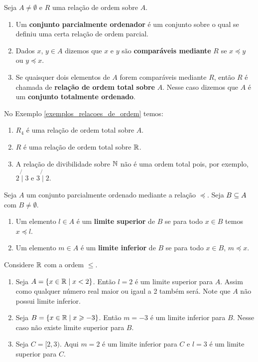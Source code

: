 \begin{definicoes}
	Seja $A \ne \emptyset$ e $R$ uma relação de ordem sobre $A$.
	\begin{enumerate}[label={\roman*})]
		\item Um \textbf{conjunto parcialmente ordenador} é um conjunto sobre o qual se definiu uma certa relação de ordem parcial.
		\item Dados $x$, $y \in A$ dizemos que $x$ e $y$ são \textbf{comparáveis mediante} $R$ se $x \preceq y$ ou $y \preceq x$.
		\item Se quaisquer dois elementos de $A$ forem comparáveis mediante $R$, então $R$ é chamada de \textbf{relação de ordem total sobre} $A$. Nesse caso dizemos que $A$ é um \textbf{conjunto totalmente ordenado}.
	\end{enumerate}
\end{definicoes}

\begin{exemplos}
	No Exemplo \ref{exemplos_relacoes_de_ordem} temos:
	\begin{enumerate}[label={\arabic*})]
		\item $R_4$ é uma relação de ordem total sobre $A$.
		\item $R$ é uma relação de ordem total sobre $\mathbb{R}$.
		\item A relação de divibilidade sobre $\mathbb{N}$ não é uma ordem total pois, por exemplo, $2 \not{\mid} 3$ e $3 \not{\mid} 2$.
	\end{enumerate}
\end{exemplos}

\begin{definicoes}
	Seja $A$ um conjunto parcialmente ordenado mediante a relação $\preceq$. Seja $B \subseteq A$ com $B \ne \emptyset$.
	\begin{enumerate}[label={\roman*})]
		\item Um elemento $l \in A$ é um \textbf{limite superior} de $B$ se para todo $x \in B$ temos $x \preceq l$.
		\item Um elemento $m \in A$ é um \textbf{limite inferior} de $B$ se para todo $x \in B$, $m \preceq x$.
	\end{enumerate}
\end{definicoes}

\begin{exemplo}
	Considere $\mathbb{R}$ com a ordem $\leqslant$.
	\begin{enumerate}[label={\arabic*})]
		\item Seja $A = \{x \in \mathbb{R} \mid x < 2\}$. Então $l = 2$ é um limite superior para $A$. Assim como qualquer número real maior ou igaul a 2 também será. Note que $A$ não possui limite inferior.
		\item Seja $B = \{x \in \mathbb{R} \mid x \geqslant -3\}$. Então $m = -3$ é um limite inferior para $B$. Nesse caso não existe limite superior para $B$.
		\item Seja $C = [2,3)$. Aqui $m = 2$ é um limite inferior para $C$ e $l = 3$ é um limite superior para $C$.
	\end{enumerate}
\end{exemplo}

